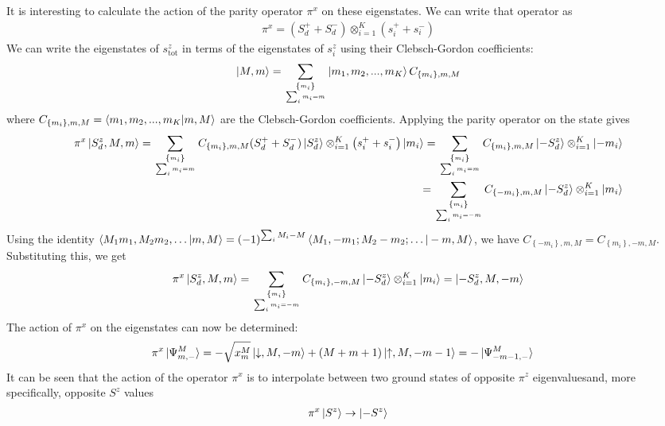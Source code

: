 \documentclass[12pt]{revtex4-2}
\begin{document}
It is interesting to calculate the action of the parity operator \(\pi^x\) on these eigenstates. We can write that operator as
\begin{align}
	\pi^x = (S_d^+ + S_d^-)\otimes_{i=1}^K \left(s_i^+ + s_i^-\right) 
\end{align}
We can write the eigenstates of \(s_\text{tot}^z\) in terms of the eigenstates of \(s_i^z\) using their Clebsch-Gordon coefficients:
\begin{align}
	\ket{M,m} = \sum_{\left\{m_i\right\}\atop{\sum_i m_i = m}}\ket{m_1,m_2,...,m_K} C_{\left\{m_i\right\},m,M}
\end{align}
where \(C_{\left\{m_i\right\},m,M} = \braket{m_1,m_2,...,m_K|m,M}\) are the Clebsch-Gordon coefficients. Applying the parity operator on the state gives
\begin{align}
	\pi^x \ket{S_d^z, M,m} = \sum_{\left\{m_i\right\}\atop{\sum_i m_i = m}}C_{\left\{m_i\right\},m,M}(S_d^+ + S_d^-)\ket{S_d^z}\otimes_{i=1}^K \left(s_i^+ + s_i^-\right)\ket{m_i} = \sum_{\left\{m_i\right\}\atop{\sum_i m_i = m}}C_{\left\{m_i\right\},m,M}\ket{-S_d^z}\otimes_{i=1}^K\ket{-m_i}\\
	=\sum_{\left\{m_i\right\}\atop{\sum_i m_i = -m}}C_{\left\{-m_i\right\},m,M}\ket{-S_d^z}\otimes_{i=1}^K\ket{m_i}
\end{align}
Using the identity \(\braket{M_1m_1,M_2m_2,\ldots|m,M} = \left( -1 \right)^{\sum_i M_i - M}\braket{M_1, -m_1; M_2 -m_2;\ldots|-m,M}\), we have \(C_{\left\{-m_i\right\},m,M} = C_{\left\{m_i\right\},-m,M}\). Substituting this, we get
\begin{align}
	\pi^x \ket{S_d^z, M,m} = \sum_{\left\{m_i\right\}\atop{\sum_i m_i = -m}}C_{\left\{m_i\right\},-m,M}\ket{-S_d^z}\otimes_{i=1}^K\ket{m_i} = \ket{-S_d^z, M, -m}
\end{align}
The action of \(\pi^x\) on the eigenstates can now be determined:
\begin{align}
	\pi^x \ket{\Psi^M_{m,-}} &=-\sqrt{x_m^M}\ket{\downarrow, M, -m} + \left(M + m + 1\right)\ket{\uparrow,M,-m-1} = -\ket{\Psi^M_{-m-1,-}}
\end{align}
It can be seen that the action of the operator \(\pi^x\) is to interpolate between two ground states of opposite \(\pi^z\) eigenvaluesand, more specifically, opposite \(S^z\) values
\begin{align}
	\pi^x \ket{S^z} \to \ket{-S^z}
\end{align}
\end{document}
